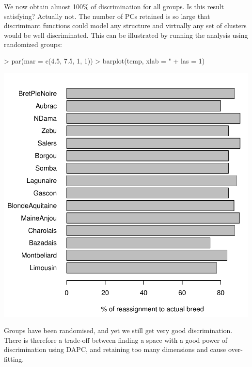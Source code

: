 \documentclass{article}
\begin{document}
\noindent We now obtain almost 100\% of discrimination for all groups.
Is this result satisfying? Actually not.
The number of PCs retained is so large that discriminant functions could model any structure and
virtually any set of clusters would be well discriminated.
This can be illustrated by running the analysis using randomized groups:
\begin{Schunk}
\end{Schunk}
\begin{Schunk}
\begin{Sinput}
> par(mar = c(4.5, 7.5, 1, 1))
> barplot(temp, xlab = "%
+     las = 1)
\end{Sinput}
\end{Schunk}
\includegraphics{figs/dapc-031}

\noindent
Groups have been randomised, and yet we still get very good discrimination.
There is therefore a trade-off between finding a space with a good power of discrimination using
DAPC, and retaining too many dimensions and cause over-fitting.
\end{document}
